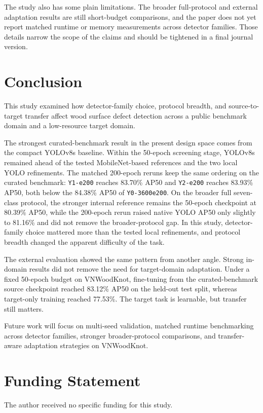 \documentclass[10pt,a4paper]{article}
\begin{document}
The study also has some plain limitations. The broader full-protocol and external adaptation results are still short-budget comparisons, and the paper does not yet report matched runtime or memory measurements across detector families. Those details narrow the scope of the claims and should be tightened in a final journal version.

\section{Conclusion}
\label{sec:conclusion}

This study examined how detector-family choice, protocol breadth, and source-to-target transfer affect wood surface defect detection across a public benchmark domain and a low-resource target domain.

The strongest curated-benchmark result in the present design space comes from the compact YOLOv8s baseline. Within the 50-epoch screening stage, YOLOv8s remained ahead of the tested MobileNet-based references and the two local YOLO refinements. The matched 200-epoch reruns keep the same ordering on the curated benchmark: \texttt{Y1-e200} reaches 83.70\% AP50 and \texttt{Y2-e200} reaches 83.93\% AP50, both below the 84.38\% AP50 of \texttt{Y0-3600e200}. On the broader full seven-class protocol, the stronger internal reference remains the 50-epoch checkpoint at 80.39\% AP50, while the 200-epoch rerun raised native YOLO AP50 only slightly to 81.16\% and did not remove the broader-protocol gap. In this study, detector-family choice mattered more than the tested local refinements, and protocol breadth changed the apparent difficulty of the task.

The external evaluation showed the same pattern from another angle. Strong in-domain results did not remove the need for target-domain adaptation. Under a fixed 50-epoch budget on VNWoodKnot, fine-tuning from the curated-benchmark source checkpoint reached 83.12\% AP50 on the held-out test split, whereas target-only training reached 77.53\%. The target task is learnable, but transfer still matters.

Future work will focus on multi-seed validation, matched runtime benchmarking across detector families, stronger broader-protocol comparisons, and transfer-aware adaptation strategies on VNWoodKnot.

\section*{Funding Statement}
The author received no specific funding for this study.
\end{document}
